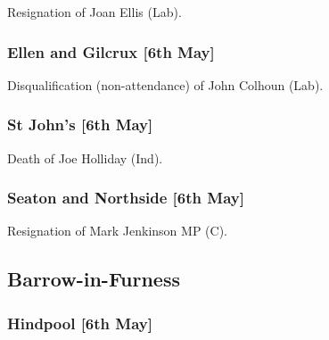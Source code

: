 \documentclass[a4paper,openany]{book}
\begin{document}
\begin{resultsiii}

Resignation of Joan Ellis (Lab).

\subsubsection*{Ellen and Gilcrux \hspace*{\fill}\nolinebreak[1]%
	\enspace\hspace*{\fill}
	[6th May]}


Disqualification (non-attendance) of John Colhoun (Lab).

\subsubsection*{St John's \hspace*{\fill}\nolinebreak[1]%
	\enspace\hspace*{\fill}
	[6th May]}


Death of Joe Holliday (Ind).

\subsubsection*{Seaton and Northside \hspace*{\fill}\nolinebreak[1]%
	\enspace\hspace*{\fill}
	[6th May]}


Resignation of Mark Jenkinson MP (C).

\subsection*{Barrow-in-Furness}

\subsubsection*{Hindpool \hspace*{\fill}\nolinebreak[1]%
	\enspace\hspace*{\fill}
	[6th May]}


\end{resultsiii}
\end{document}
